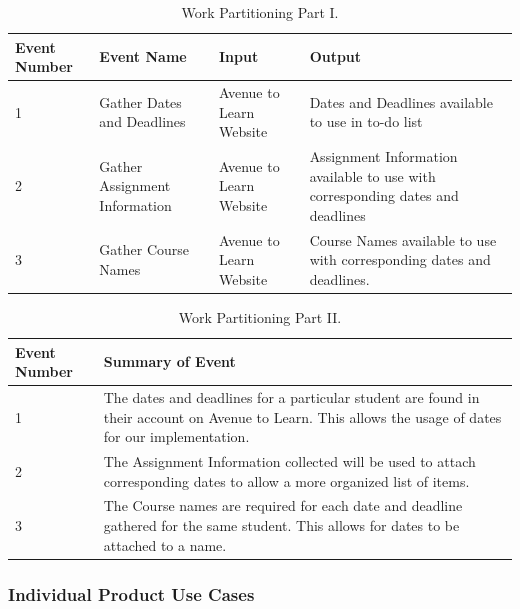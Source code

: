 \documentclass[12pt, titlepage]{article}
\begin{document}
\begin{table}[H]
\caption{Work Partitioning Part I.}
\begin{center}
\begin{tabular}{ |m{4em}|m{8em}|m{10em}|m{10em}| } 
 \hline
 Event Number & Event Name & Input & Output \\ 
 \hline
 1 & Gather Dates and Deadlines & Avenue to Learn Website & Dates and Deadlines available to use in to-do list \\
 \hline
 2 & Gather Assignment Information & Avenue to Learn Website & Assignment Information available to use with corresponding dates and deadlines\\ 
 \hline
 3 & Gather Course Names & Avenue to Learn Website & Course Names available to use with corresponding dates and deadlines.\\
 \hline 
\end{tabular}
\end{center}
\label{wp1}
\end{table}

\begin{table}[H]
\caption {Work Partitioning Part II.}
\begin{center}
\begin{tabular}{ |m{4em}|m{28em}| } 
 \hline
 Event Number & Summary of Event \\ 
 \hline
 1 & The dates and deadlines for a particular student are found in their account on Avenue to Learn. This allows the usage of dates for our implementation. \\
 \hline
 2 & The Assignment Information collected will be used to attach corresponding dates to allow a more organized list of items.\\ 
 \hline
 3 & The Course names are required for each date and deadline gathered for the same student. This allows for dates to be attached to a name. \\
 \hline 
\end{tabular}
\end{center}
\label{wp2}
\end{table}

\subsubsection{Individual Product Use Cases}
\end{document}
